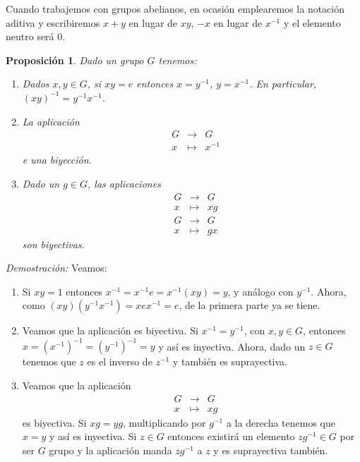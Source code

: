 \documentclass[12pt]{article}
\newtheorem{proposition}[theorem]{Proposición}
\begin{document}
Cuando trabajemos con grupos abelianos, en ocasión emplearemos la notación aditiva y escribiremos $x+y$ en lugar de $xy$, $-x$ en lugar de $x^{-1}$ y el elemento neutro será $0$.

\begin{proposition}\label{eq:primGrup} Dado un grupo $G$ tenemos:
\begin{enumerate}
\item Dados $x,y \in G$, si $xy = e$ entonces $x = y^{-1}$, $y = x^{-1}$. En particular, $(xy)^{-1} = y^{-1}x^{-1}$.
\item La aplicación $$\begin{array}{rccl}
&G&\longrightarrow &G\\
&x& \longmapsto &x^{-1}
\end{array}
$$ e una biyección.
\item Dado un $g \in G$, las aplicaciones $$\begin{array}{rccl}
&G&\longrightarrow &G\\
&x& \longmapsto &xg
\end{array}
$$
$$\begin{array}{rccl}
&G&\longrightarrow &G\\
&x& \longmapsto &gx
\end{array}
$$ son biyectivas.
\end{enumerate}
\end{proposition}
\emph{Demostración: }Veamos: \begin{enumerate}
\item Si $xy = 1$ entonces $x^{-1} = x^{-1}e= x^{-1}(xy) = y$, y análogo con $y^{-1}$. Ahora, como $(xy) (y^{-1}x^{-1})=xex^{-1} = e$, de la primera parte ya se tiene.
\item Veamos que la aplicación es biyectiva. Si $x^{-1} = y^{-1}$, con $x,y \in G$, entonces $x = (x^{-1})^{-1} = (y^{-1})^{-1}=y$ y así es inyectiva. Ahora, dado un $z \in G$ tenemos que $z$ es el inverso de $z^{-1}$ y también es suprayectiva.
\item Veamos que la aplicación $$\begin{array}{rccl}
&G&\longrightarrow &G\\
&x& \longmapsto &xg
\end{array}
$$ es biyectiva. Si $xg = yg$, multiplicando por $g^{-1}$ a la derecha tenemos que $x = y$ y así es inyectiva. Si $z \in G$ entonces existirá un elemento $zg^{-1} \in G$ por ser $G$ grupo y la aplicación manda $zg^{-1}$ a $z$ y es suprayectiva también.
\end{enumerate}
\end{document}
